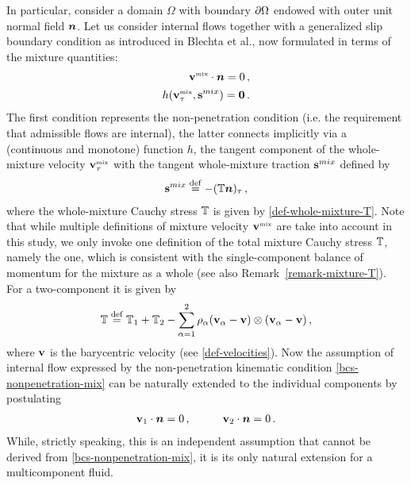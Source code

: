 \documentclass[a4paper]{article}
\begin{document}
In particular, consider a domain $\Omega$ with boundary $\partial\Omega$ endowed with outer unit normal field $\mbox{\boldmath $n$}$. Let us consider internal flows together with a generalized slip boundary condition as introduced in Blechta et al.\cite{blechta-2020}, now formulated in terms of the mixture quantities:
\begin{subequations}
\label{bcs-mixture}
\begin{align}
\label{bcs-nonpenetration-mix}
{\bf v}^{\mbox{\tiny{mix}}}\cdot\mbox{\boldmath $n$} = 0\,,\\
\label{bcs-genslip-mix}
h({\bf v}^{\mbox{\tiny{mix}}}_\tau,\mathbf{s}^{mix}) = {\bf 0}\,.
\end{align}
\end{subequations}
The first condition represents the non-penetration condition (i.e. the requirement that admissible flows are internal), the latter connects
implicitly via a (continuous and monotone) function $h$, 
the tangent component of the whole-mixture velocity ${\bf v}^{\mbox{\tiny{mix}}}_\tau$ with the tangent whole-mixture traction $\mathbf{s}^{mix}$ defined by
\begin{align}
\label{def-smix}
\mathbf{s}^{mix} \stackrel{\mathrm{def}}{=} -(\mathbb{T}\mbox{\boldmath $n$})_\tau\,,
\end{align}
where the whole-mixture Cauchy stress $\mathbb{T}$ is given by \eqref{def-whole-mixture-T}. Note that while multiple definitions of mixture velocity ${\bf v}^{\mbox{\tiny{mix}}}$ are take into account in this study, we only invoke one definition of the total mixture Cauchy stress $\mathbb{T}$, namely the one, which is consistent with the single-component balance of momentum for the mixture as a whole (see also Remark~\ref{remark-mixture-T}). For a two-component it is given by
\begin{align}
\label{def-Tmix}
\mathbb{T}\stackrel{\mathrm{def}}{=} \mathbb{T}_1+\mathbb{T}_2 - \sum_{\alpha=1}^2 \rho_\alpha({\bf v}_\alpha-{\bf v})\otimes({\bf v}_\alpha-{\bf v})\,,
\end{align}
where ${\bf v}$ is the barycentric velocity (see \eqref{def-velocities}). 
Now the assumption of internal flow expressed by the non-penetration kinematic condition  \eqref{bcs-nonpenetration-mix} can be naturally extended to the individual components by postulating 
\begin{align}
\label{bcs-nonpenetration-cpomponents}
{\bf v}_1\cdot\mbox{\boldmath $n$} = 0\,,\hspace{1cm}{\bf v}_2\cdot\mbox{\boldmath $n$} = 0\,.
\end{align}
While, strictly speaking, this is an independent assumption that cannot be derived from \eqref{bcs-nonpenetration-mix}, it is its only natural extension for a multicomponent fluid. 
\end{document}
